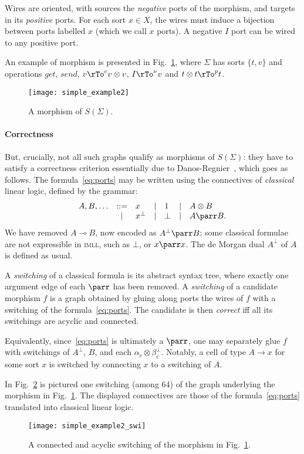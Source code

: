 \documentclass{llncs}
\newcommand{\imll}{\textsc{imll}}
\newcommand{\un}{1}
\newcommand{\impll}{\multimap}
\newcommand{\tens}{\otimes}
\begin{document}
Wires are oriented, with sources the \emph{negative} ports of the
morphism, and targets in its \emph{positive} ports.  For each sort $x
\in X$, the wires must induce a bijection between ports labelled $x$
(which we call $x$ ports).  A negative $I$ port can be wired to any
positive port.

An example of morphism is presented in Fig.~\ref{freesig:example:ii}, where
$\Sigma$ has sorts $\{t,v\}$ and operations $\mathit{get}$, $\mathit{send}$, $v
\rTo^{c} v \tens v$, $I \rTo^{\nu} v$ and $t \tens t \rTo^{p} t$.
\begin{figure}[ht] \centering
    \texttt{[image: simple\_example2]}
    \caption{A morphism of $S(\Sigma)$.}
    \label{freesig:example:ii}
\end{figure}

\paragraph{Correctness}
But, crucially, not all such graphs qualify as morphisms of $S
(\Sigma)$: they have to satisfy a correctness criterion essentially
due to Danos-Regnier~\cite{Danos:mll}, which goes as follows.
The formula~\eqref{eq:ports} may be written using the connectives
of \emph{classical} linear logic, defined by the grammar:
$$\begin{array}{rcl@{\quad \mid \quad}l@{\quad \mid \quad}l}
A, B, \ldots & ::= & x    &  \un &  A \otimes B \\
&  \mid   & x^\bot & \bot & A \parr B.
\end{array}$$
We have removed $A \impll B$, now encoded as $A^\bot \parr B$; some
classical formulae are not expressible in \imll{}, such as $\bot$, or
$x \parr x$. The de Morgan dual $A^\bot$ of $A$ is defined as usual.

A \emph{switching} of a classical formula is its abstract syntax tree,
where exactly one argument edge of each $\parr$ has been removed. A
\emph{switching} of a candidate morphism $f$ is a graph obtained by
gluing along ports the wires of $f$ with a switching of the
formula~\eqref{eq:ports}. The candidate is then \emph{correct} iff all
its switchings are acyclic and connected.

Equivalently, since~\eqref{eq:ports} is ultimately a $\parr$, one may
separately glue $f$ with switchings of $A^\bot$, $B$, and each
$\alpha_c \tens \beta_c^\bot$. Notably, a cell of type $A \to x$ for
some sort $x$ is switched by connecting $x$ to a switching of $A$.

In Fig.~\ref{freesig:super_example} is pictured one switching (among 64) of
the graph underlying the morphism in Fig.~\ref{freesig:example:ii}. 
The displayed connectives are those of the formula~\eqref{eq:ports} translated
into classical linear logic. 
\begin{figure}[ht] \centering
    \texttt{[image: simple\_example2\_swi]}
    \caption{A connected and acyclic switching of the morphism in Fig.~\ref{freesig:example:ii}.}
    \label{freesig:super_example}
\end{figure}
\end{document}
